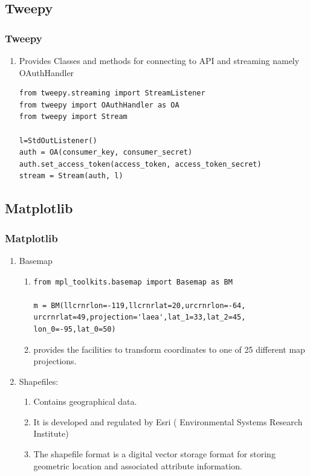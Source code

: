 \documentclass{beamer}
\begin{document}
\subsection{Tweepy}
\begin{frame}[fragile]
\frametitle{Tweepy}
\begin{enumerate}
\item Provides Classes and methods for connecting to API and streaming namely
OAuthHandler
\lstset{language=Python,showstringspaces=false}
\begin{lstlisting}
from tweepy.streaming import StreamListener
from tweepy import OAuthHandler as OA
from tweepy import Stream

l=StdOutListener()
auth = OA(consumer_key, consumer_secret)
auth.set_access_token(access_token, access_token_secret)
stream = Stream(auth, l)
\end{lstlisting}

\end{enumerate}
\end{frame}





\subsection{Matplotlib}


\begin{frame}[fragile]
\frametitle{Matplotlib}

\begin{enumerate}
\item Basemap
\begin{enumerate}
\item[]
\lstset{language=Python,showstringspaces=false}
\begin{lstlisting}
from mpl_toolkits.basemap import Basemap as BM

m = BM(llcrnrlon=-119,llcrnrlat=20,urcrnrlon=-64,
urcrnrlat=49,projection='laea',lat_1=33,lat_2=45,
lon_0=-95,lat_0=50)
\end{lstlisting}
\item provides the facilities to transform coordinates to one of 25 different map projections.
\end{enumerate}

\item Shapefiles:
\begin{enumerate}
\item  Contains geographical data.
\item It is developed and regulated by Esri ( Environmental Systems Research Institute)
\item The shapefile format is a digital vector storage format for storing geometric location and associated attribute information.
\end{enumerate}
\end{enumerate}
\end{frame}
\end{document}
